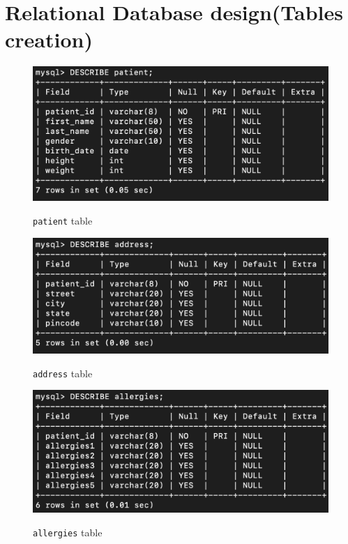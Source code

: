 \documentclass[12pt]{article}
\let\oldtexttt\texttt
\renewcommand{\texttt}[1]{
  \colorbox{bgcolor}{\oldtexttt{#1}}
  }
\begin{document}
\newpage
\section{Relational Database design(Tables creation)}

\begin{figure}[!hbt]
    \centering
    \includegraphics[scale=0.85]{tables/1.png}
    \label{fig:data}
    \caption{\texttt{patient} table}
\end{figure}

\vspace{5mm}

\begin{figure}[!hbt]
    \centering
    \includegraphics[scale=0.85]{tables/2.png}
    \label{fig:my_label1}
    \caption{\texttt{address} table}
\end{figure}

\newpage

\begin{figure}[!hbt]
    \centering
    \includegraphics[scale=0.85]{tables/3.png}
    \label{fig:data}
    \caption{\texttt{allergies} table}
\end{figure}
\end{document}
